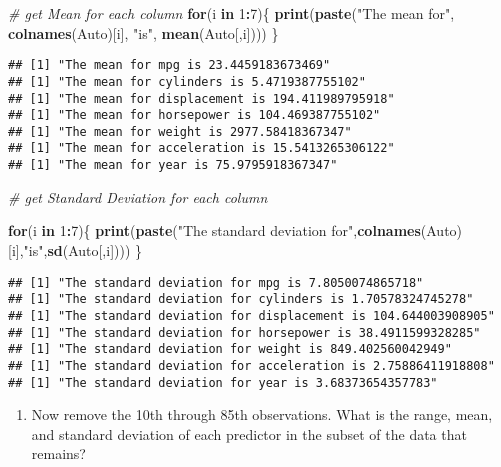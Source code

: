 \documentclass[]{article}
\newenvironment{Shaded}{\begin{snugshade}}{\end{snugshade}}
\newcommand{\KeywordTok}[1]{\textcolor[rgb]{0.13,0.29,0.53}{\textbf{#1}}}
\newcommand{\DecValTok}[1]{\textcolor[rgb]{0.00,0.00,0.81}{#1}}
\newcommand{\StringTok}[1]{\textcolor[rgb]{0.31,0.60,0.02}{#1}}
\newcommand{\CommentTok}[1]{\textcolor[rgb]{0.56,0.35,0.01}{\textit{#1}}}
\newcommand{\ControlFlowTok}[1]{\textcolor[rgb]{0.13,0.29,0.53}{\textbf{#1}}}
\newcommand{\OperatorTok}[1]{\textcolor[rgb]{0.81,0.36,0.00}{\textbf{#1}}}
\newcommand{\NormalTok}[1]{#1}
\providecommand{\tightlist}{%
  \setlength{\itemsep}{0pt}\setlength{\parskip}{0pt}}
\begin{document}
\begin{Shaded}
\begin{Highlighting}[]
\CommentTok{# get Mean for each column}
\ControlFlowTok{for}\NormalTok{(i }\ControlFlowTok{in} \DecValTok{1}\OperatorTok{:}\DecValTok{7}\NormalTok{)\{}
        \KeywordTok{print}\NormalTok{(}\KeywordTok{paste}\NormalTok{(}\StringTok{"The mean for"}\NormalTok{, }\KeywordTok{colnames}\NormalTok{(Auto)[i], }\StringTok{"is"}\NormalTok{, }\KeywordTok{mean}\NormalTok{(Auto[,i])))}
\NormalTok{\}}
\end{Highlighting}
\end{Shaded}

\begin{verbatim}
## [1] "The mean for mpg is 23.4459183673469"
## [1] "The mean for cylinders is 5.4719387755102"
## [1] "The mean for displacement is 194.411989795918"
## [1] "The mean for horsepower is 104.469387755102"
## [1] "The mean for weight is 2977.58418367347"
## [1] "The mean for acceleration is 15.5413265306122"
## [1] "The mean for year is 75.9795918367347"
\end{verbatim}

\begin{Shaded}
\begin{Highlighting}[]
\CommentTok{# get Standard Deviation for each column}

\ControlFlowTok{for}\NormalTok{(i }\ControlFlowTok{in} \DecValTok{1}\OperatorTok{:}\DecValTok{7}\NormalTok{)\{}
        \KeywordTok{print}\NormalTok{(}\KeywordTok{paste}\NormalTok{(}\StringTok{"The standard deviation for"}\NormalTok{,}\KeywordTok{colnames}\NormalTok{(Auto)[i],}\StringTok{"is"}\NormalTok{,}\KeywordTok{sd}\NormalTok{(Auto[,i])))}
\NormalTok{\}}
\end{Highlighting}
\end{Shaded}

\begin{verbatim}
## [1] "The standard deviation for mpg is 7.8050074865718"
## [1] "The standard deviation for cylinders is 1.70578324745278"
## [1] "The standard deviation for displacement is 104.644003908905"
## [1] "The standard deviation for horsepower is 38.4911599328285"
## [1] "The standard deviation for weight is 849.402560042949"
## [1] "The standard deviation for acceleration is 2.75886411918808"
## [1] "The standard deviation for year is 3.68373654357783"
\end{verbatim}

\begin{enumerate}
\def\labelenumi{(\alph{enumi})}
\setcounter{enumi}{3}
\tightlist
\item
  Now remove the 10th through 85th observations. What is the range,
  mean, and standard deviation of each predictor in the subset of the
  data that remains?
\end{enumerate}
\end{document}
